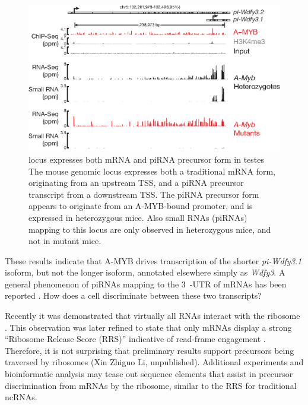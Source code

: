     \begin{figure} %
      \centering 
      \includegraphics{Figures/Discussion/pi-wdfy3.eps}
      \caption[\wdfy{} locus expresses both mRNA and piRNA precursor form in testes]
      {\wdfy{} locus expresses both mRNA and piRNA precursor form in testes\\[0.25cm]
        The mouse genomic locus \wdfy{} expresses both a traditional mRNA form, originating from an upstream TSS, and a piRNA precursor transcript from a downstream TSS. The piRNA precursor form appears to originate from an A-MYB-bound promoter, and is expressed in \amyb{} heterozygous mice. Also small RNAs (piRNAs) mapping to this locus are only observed in \amyb{} heterozygous mice, and not in \amyb{} mutant mice.
        }
      \label{Disc:fig:wdfy3}
      \end{figure}

    These results indicate that A-MYB drives transcription of the shorter \textit{pi-Wdfy3.1} isoform, but not the longer isoform, annotated elsewhere simply as \textit{Wdfy3}. A general phenomenon of piRNAs mapping to the 3\textprime~-UTR of mRNAs has been reported \citep{Robine2009}. How does a cell discriminate between these two transcripts?

    Recently it was demonstrated that virtually all RNAs interact with the ribosome \citep{Ingolia2011}. This observation was later refined to state that only mRNAs display a strong ``Ribosome Release Score (RRS)'' indicative of read-frame engagement \citep{Guttman2013}. Therefore, it is not surprising that preliminary results support precursors being traversed by ribosomes (Xin Zhiguo Li, unpublished). Additional experiments and bioinformatic analysis may tease out sequence elements that assist in precursor discrimination from mRNAs by the ribosome, similar to the RRS for traditional ncRNAs.

